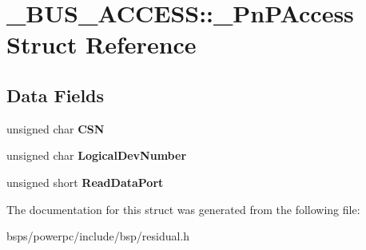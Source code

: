 \hypertarget{struct__BUS__ACCESS_1_1__PnPAccess}{}\section{\+\_\+\+B\+U\+S\+\_\+\+A\+C\+C\+E\+SS\+::\+\_\+\+Pn\+P\+Access Struct Reference}
\label{struct__BUS__ACCESS_1_1__PnPAccess}
\subsection*{Data Fields}
\begin{DoxyCompactItemize}
\item 
\mbox{\label{struct__BUS__ACCESS_1_1__PnPAccess_a133e1a2cc557e6d9a29821640345ca25}} 
unsigned char {\bfseries C\+SN}
\item 
\mbox{\label{struct__BUS__ACCESS_1_1__PnPAccess_a86c6915ee8176743f88fc352e1ea920b}} 
unsigned char {\bfseries Logical\+Dev\+Number}
\item 
\mbox{\label{struct__BUS__ACCESS_1_1__PnPAccess_a9d4b40106db55d20a577e1180a1c6cc6}} 
unsigned short {\bfseries Read\+Data\+Port}
\end{DoxyCompactItemize}


The documentation for this struct was generated from the following file\+:\begin{DoxyCompactItemize}
\item 
bsps/powerpc/include/bsp/residual.\+h\end{DoxyCompactItemize}
